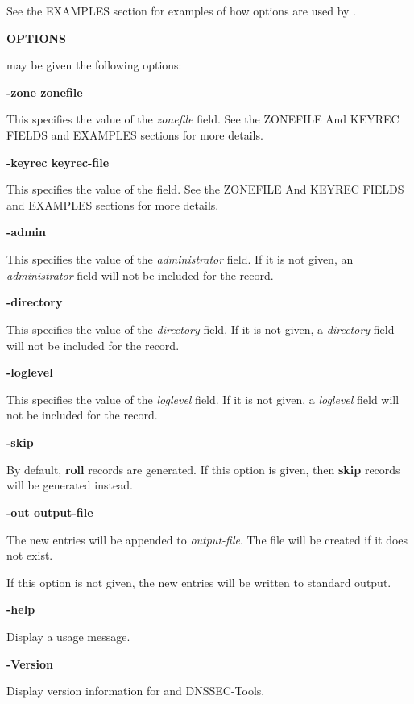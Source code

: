 See the EXAMPLES section for examples of how options are used by .

{\bf OPTIONS}

 may be given the following options:

\begin{description}

\item {\bf -zone zonefile}\verb" "

This specifies the value of the {\it zonefile} field.
See the ZONEFILE And KEYREC FIELDS and EXAMPLES sections for more details.

\item {\bf -keyrec keyrec-file}\verb" "

This specifies the value of the  field.
See the ZONEFILE And KEYREC FIELDS and EXAMPLES sections for more details.

\item {\bf -admin}\verb" "

This specifies the value of the {\it administrator} field.  If it is not given,
an {\it administrator} field will not be included for the record.

\item {\bf -directory}\verb" "

This specifies the value of the {\it directory} field.  If it is not given,
a {\it directory} field will not be included for the record.

\item {\bf -loglevel}\verb" "

This specifies the value of the {\it loglevel} field.  If it is not given, a
{\it loglevel} field will not be included for the record.

\item {\bf -skip}\verb" "

By default, {\bf roll} records are generated.  If this option is given, then
{\bf skip} records will be generated instead.

\item {\bf -out output-file}\verb" "

The new  entries will be appended to {\it output-file}.
The file will be created if it does not exist.

If this option is not given, the new  entries will be written
to standard output.

\item {\bf -help}\verb" "

Display a usage message.

\item {\bf -Version}\verb" "

Display version information for  and DNSSEC-Tools.

\end{description}

